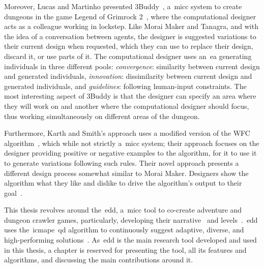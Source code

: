 Moreover, Lucas and Martinho presented 3Buddy~\cite{lucas_stay_2017}, a~\acrshort{micc} system to create dungeons in the game Legend of Grimrock 2~\cite{legGrim2}, where the computational designer acts as a colleague working in lockstep. Like Morai Maker and Tanagra, and with the idea of a conversation between agents, the designer is suggested variations to their current design when requested, which they can use to replace their design, discard it, or use parts of it. The computational designer uses an~\acrshort{ea} generating individuals in three different pools: \textit{convergence}: similarity between current design and generated individuals, \textit{innovation}: dissimilarity between current design and generated individuals, and \textit{guidelines}: following human-input constraints. The most interesting aspect of 3Buddy is that the designer can specify an area where they will work on and another where the computational designer should focus, thus working simultaneously on different areas of the dungeon.

Furthermore, Karth and Smith's approach uses a modified version of the WFC algorithm~\cite{karth_wavefunctioncollapse_2017}, which while not strictly a~\acrshort{micc} system; their approach focuses on the designer providing positive or negative examples to the algorithm, for it to use it to generate variations following such rules. Their novel approach presents a different design process somewhat similar to Morai Maker. Designers show the algorithm what they like and dislike to drive the algorithm's output to their goal~\cite{karth_addressing_2019}. 





This thesis revolves around the~\acrfull{edd}, a~\acrshort{micc} tool to co-create adventure and dungeon crawler games, particularly, developing their narrative~\cite{alvarez_questgram_2021,alvarez_story_2022} and levels~\cite{alvarez_empowering_2019}.~\acrshort{edd} uses the~\acrlong{icmape}~\acrshort{qd} algorithm to continuously suggest adaptive, diverse, and high-performing solutions~\cite{alvarez_interactive_2020}. As~\acrshort{edd} is the main research tool developed and used in this thesis, a chapter is reserved for presenting the tool, all its features and algorithms, and discussing the main contributions around it.

